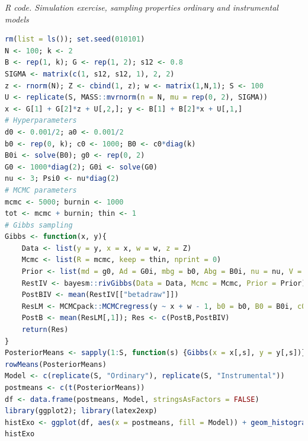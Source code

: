 \begin{tcolorbox}[enhanced,width=4.67in,center upper,
	fontupper=\large\bfseries,drop shadow southwest,sharp corners]
	\textit{R code. Simulation exercise, sampling properties ordinary and instrumental models}
	\begin{VF}
		\begin{lstlisting}[language=R]
rm(list = ls()); set.seed(010101)
N <- 100; k <- 2
B <- rep(1, k); G <- rep(1, 2); s12 <- 0.8
SIGMA <- matrix(c(1, s12, s12, 1), 2, 2)
z <- rnorm(N); Z <- cbind(1, z); w <- matrix(1,N,1); S <- 100
U <- replicate(S, MASS::mvrnorm(n = N, mu = rep(0, 2), SIGMA))
x <- G[1] + G[2]*z + U[,2,]; y <- B[1] + B[2]*x + U[,1,]
# Hyperparameters
d0 <- 0.001/2; a0 <- 0.001/2
b0 <- rep(0, k); c0 <- 1000; B0 <- c0*diag(k)
B0i <- solve(B0); g0 <- rep(0, 2)
G0 <- 1000*diag(2); G0i <- solve(G0)
nu <- 3; Psi0 <- nu*diag(2)
# MCMC parameters
mcmc <- 5000; burnin <- 1000
tot <- mcmc + burnin; thin <- 1
# Gibbs sampling
Gibbs <- function(x, y){
	Data <- list(y = y, x = x, w = w, z = Z)
	Mcmc <- list(R = mcmc, keep = thin, nprint = 0)
	Prior <- list(md = g0, Ad = G0i, mbg = b0, Abg = B0i, nu = nu, V = Psi0)
	RestIV <- bayesm::rivGibbs(Data = Data, Mcmc = Mcmc, Prior = Prior)
	PostBIV <- mean(RestIV[["betadraw"]])
	ResLM <- MCMCpack::MCMCregress(y ~ x + w - 1, b0 = b0, B0 = B0i, c0 = a0, d0 = d0)
	PostB <- mean(ResLM[,1]); Res <- c(PostB,PostBIV)
	return(Res)
}
PosteriorMeans <- sapply(1:S, function(s) {Gibbs(x = x[,s], y = y[,s])})
rowMeans(PosteriorMeans)
Model <- c(replicate(S, "Ordinary"), replicate(S, "Instrumental"))
postmeans <- c(t(PosteriorMeans))
df <- data.frame(postmeans, Model, stringsAsFactors = FALSE)
library(ggplot2); library(latex2exp)
histExo <- ggplot(df, aes(x = postmeans, fill = Model)) + geom_histogram(bins = 40, position = "identity", color = "black", alpha = 0.5) + labs(title = "Overlayed Histograms", x = "Value", y = "Count") + scale_fill_manual(values = c("blue", "red")) + geom_vline(aes(xintercept = mean(postmeans[1:S])), color = "black", linewidth = 1, linetype = "dashed") + geom_vline(aes(xintercept = mean(postmeans[101:200])), color = "black", linewidth = 1, linetype = "dashed") + geom_vline(aes(xintercept = B[2]), color = "green", linewidth = 1, linetype = "dashed") + xlab(TeX("$E[\\beta_2]$")) + ylab("Frequency") + ggtitle("Histogram: Posterior means simulating 100 samples") 
histExo 
\end{lstlisting}
	\end{VF}
\end{tcolorbox}

